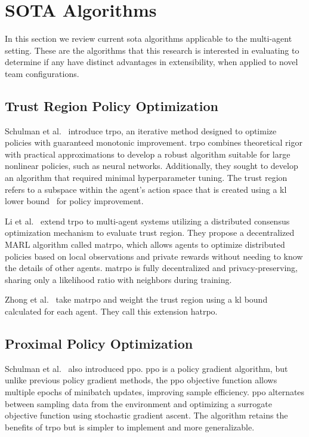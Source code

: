 \section{SOTA Algorithms}

In this section we review current \gls{sota} algorithms
applicable to the multi-agent setting.
These are the algorithms that this research is interested 
in evaluating to determine if any have distinct advantages
in extensibility, when applied to novel team configurations.

%

    \subsection*{Trust Region Policy Optimization}

Schulman et al.~\cite{schulman2017} introduce \gls{trpo}, an iterative 
method designed to optimize policies with guaranteed monotonic improvement. 
\Gls{trpo} combines theoretical rigor with practical approximations to 
develop a robust algorithm suitable for large nonlinear policies, 
such as neural networks. Additionally, they sought to develop 
an algorithm that required minimal hyperparameter tuning.
%
The trust region refers to a subspace within the agent's action
space that is created using a \gls{kl} lower bound~%
\cite{kakade2002} for policy improvement.

Li et al.~\cite{li2023c} extend \gls{trpo} to multi-agent systems
utilizing a distributed consensus optimization mechanism to 
evaluate trust region. They propose a decentralized MARL algorithm called 
\gls{matrpo}, which allows agents to optimize 
distributed policies based on local observations and private rewards 
without needing to know the details of other agents. 
\gls{matrpo} is fully decentralized and privacy-preserving, 
sharing only a likelihood ratio with neighbors during training. 

Zhong et al.~\cite{zhong2024} take \gls{matrpo} and weight the 
trust region using a \gls{kl} bound calculated for each agent.
They call this extension \gls{hatrpo}.

\subsection*{Proximal Policy Optimization}
Schulman et al.~\cite{schulman2017a} also introduced \gls{ppo}.
\Gls{ppo} is a policy gradient algorithm, but unlike previous 
policy gradient methods, the \gls{ppo} objective function allows 
multiple epochs of minibatch updates, improving sample efficiency. 
\Gls{ppo} alternates between sampling data from the environment and 
optimizing a surrogate objective function using stochastic gradient ascent. 
The algorithm retains the benefits of \gls{trpo} but is simpler to 
implement and more generalizable.

